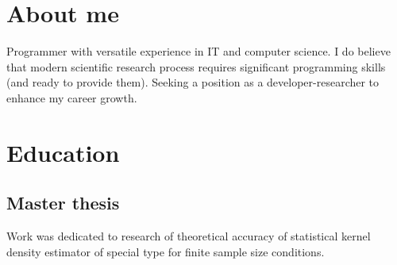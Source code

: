 \documentclass[12pt,a4paper,sans]{moderncv}
\begin{document}
\makecvtitle

\section{About me}
Programmer with versatile experience in IT and computer science.
I do believe that modern scientific research process requires significant programming skills (and ready to provide them).
Seeking a position as a developer-researcher to enhance my career growth.

\section{Education}

\subsection{Master thesis}
Work was dedicated to research of theoretical accuracy of statistical kernel density estimator of special type for finite sample size conditions.
\end{document}
